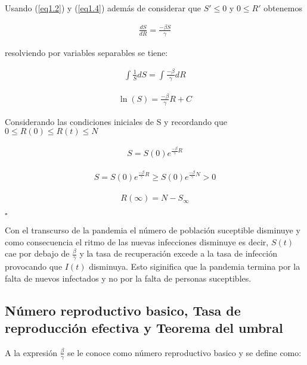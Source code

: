 \begin{Dem}

Usando (\ref{eq1.2}) y (\ref{eq1.4}) además de considerar que $S' \leq 0$ y $0 \leq R'$ obtenemos 

\begin{align*}
\frac{dS}{dR} = \frac{-\beta S}{\gamma}
\end{align*}

resolviendo por variables separables se tiene:

\begin{align*}
\int \frac{1}{S} dS = \int \frac{-\beta}{\gamma} dR 
\end{align*}

\begin{align*}
\ln(S) = \frac{-\beta}{\gamma} R + C
\end{align*}

Considerando las condiciones iniciales de S y recordando que $0 \leq R(0) \leq R(t) \leq N$

\begin{align*}
S = S(0) e^{\frac{-\beta}{\gamma}R}
\end{align*}

\begin{align*}
S = S(0) e^{\frac{-\beta}{\gamma}R} \geq S(0) e^{\frac{-\beta}{\gamma}N} > 0
\end{align*}

\begin{align*}
R(\infty) = N - S_{\infty}
\end{align*}

\end{Dem}

\hfill	$\square$

Con el transcurso de la pandemia el número de población suceptible disminuye y como consecuencia el ritmo de las nuevas infecciones disminuye es decir, $S(t)$ cae por debajo de $\frac{\beta}{\gamma}$ y la tasa de recuperación excede a la tasa de infección provocando que $I(t)$ disminuya. Esto siginifica que la pandemia termina por la falta de nuevos infectados y no por la falta de personas suceptibles.

\subsection{Número reproductivo basico,  Tasa de reproducción efectiva  y Teorema del umbral}
A la expresión $\frac{\beta}{\gamma}$ se le conoce como número reproductivo basico y se define como:

